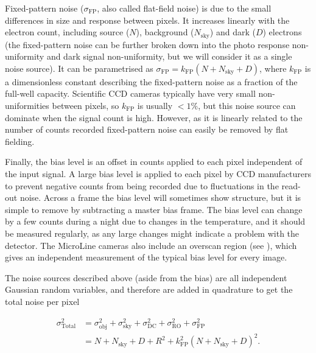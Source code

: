 \begin{colsection}
Fixed-pattern noise ($\sigma_\text{FP}$, also called flat-field noise) is due to the small differences in size and response between pixels. It increases linearly with the electron count, including source ($N$), background ($N_\text{sky}$) and dark ($D$) electrons (the fixed-pattern noise can be further broken down into the photo response non-uniformity and dark signal non-uniformity, but we will consider it as a single noise source). It can be parametrised as $\sigma_\text{FP} = k_\text{FP}(N+N_\text{sky}+D)$, where $k_\text{FP}$ is a dimensionless constant describing the fixed-pattern noise as a fraction of the full-well capacity. Scientific CCD cameras typically have very small non-uniformities between pixels, so $k_\text{FP}$ is usually $<1\%$, but this noise source can dominate when the signal count is high. However, as it is linearly related to the number of counts recorded fixed-pattern noise can easily be removed by flat fielding.

Finally, the bias level is an offset in counts applied to each pixel independent of the input signal. A large bias level is applied to each pixel by CCD manufacturers to prevent negative counts from being recorded due to fluctuations in the read-out noise. Across a frame the bias level will sometimes show structure, but it is simple to remove by subtracting a master bias frame. The bias level can change by a few counts during a night due to changes in the temperature, and it should be measured regularly, as any large changes might indicate a problem with the detector. The MicroLine cameras also include an overscan region (see ), which gives an independent measurement of the typical bias level for every image.

The noise sources described above (aside from the bias) are all independent Gaussian random variables, and therefore are added in quadrature to get the total noise per pixel

\begin{equation}
    \begin{split}
        \sigma_\text{Total}^2 & = \sigma_\text{obj}^2 +
                                  \sigma_\text{sky}^2 +
                                  \sigma_\text{DC}^2 +
                                  \sigma_\text{RO}^2 +
                                  \sigma_\text{FP}^2 \\
                              & = N + N_\text{sky} + D + R^2 + k_\text{FP}^2{(N+N_\text{sky}+D)}^2.
    \end{split}
    \label{eq:noise}
\end{equation}

\end{colsection}

